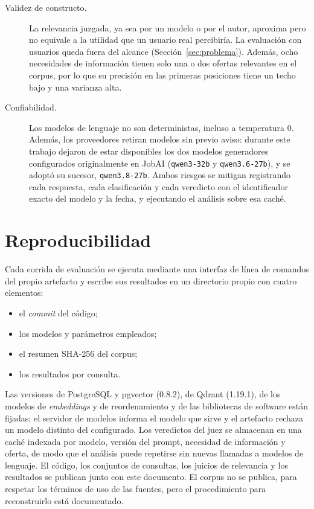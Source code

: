 \begin{description}
    \item[Validez de constructo.] La relevancia juzgada, ya sea por un modelo o por el autor, aproxima pero no equivale a la utilidad que un usuario real percibiría. La evaluación con usuarios queda fuera del alcance (Sección~\ref{sec:problema}). Además, ocho necesidades de información tienen solo una o dos ofertas relevantes en el corpus, por lo que su precisión en las primeras posiciones tiene un techo bajo y una varianza alta.
    \item[Confiabilidad.] Los modelos de lenguaje no son deterministas, incluso a temperatura 0. Además, los proveedores retiran modelos sin previo aviso: durante este trabajo dejaron de estar disponibles los dos modelos generadores configurados originalmente en JobAI (\texttt{qwen3-32b} y \texttt{qwen3.6-27b}), y se adoptó su sucesor, \texttt{qwen3.8-27b}. Ambos riesgos se mitigan registrando cada respuesta, cada clasificación y cada veredicto con el identificador exacto del modelo y la fecha, y ejecutando el análisis sobre esa caché.
\end{description}

\section{Reproducibilidad}
\label{sec:met-reproducibilidad}

Cada corrida de evaluación se ejecuta mediante una interfaz de línea de comandos del propio artefacto y escribe sus resultados en un directorio propio con cuatro elementos:
\begin{itemize}
    \item el \textit{commit} del código;
    \item los modelos y parámetros empleados;
    \item el resumen SHA-256 del corpus;
    \item los resultados por consulta.
\end{itemize}
Las versiones de PostgreSQL y pgvector (0.8.2), de Qdrant (1.19.1), de los modelos de \textit{embeddings} y de reordenamiento y de las bibliotecas de software están fijadas; el servidor de modelos informa el modelo que sirve y el artefacto rechaza un modelo distinto del configurado. Los veredictos del juez se almacenan en una caché indexada por modelo, versión del prompt, necesidad de información y oferta, de modo que el análisis puede repetirse sin nuevas llamadas a modelos de lenguaje. El código, los conjuntos de consultas, los juicios de relevancia y los resultados se publican junto con este documento. El corpus no se publica, para respetar los términos de uso de las fuentes, pero el procedimiento para reconstruirlo está documentado.
